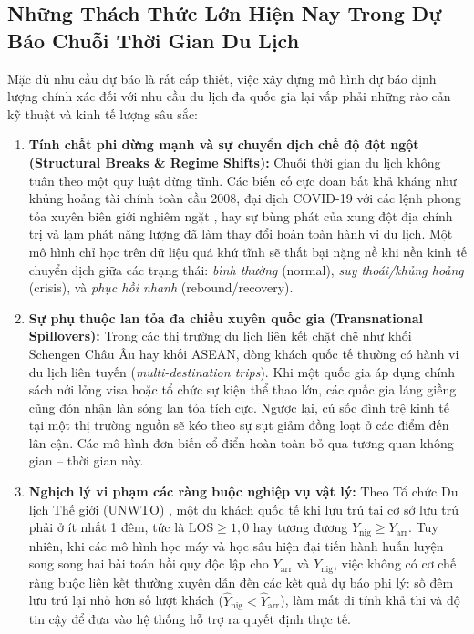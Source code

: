 \subsection{Những Thách Thức Lớn Hiện Nay Trong Dự Báo Chuỗi Thời Gian Du Lịch}
Mặc dù nhu cầu dự báo là rất cấp thiết, việc xây dựng mô hình dự báo định lượng chính xác đối với nhu cầu du lịch đa quốc gia lại vấp phải những rào cản kỹ thuật và kinh tế lượng sâu sắc:
\begin{enumerate}
    \item \textbf{Tính chất phi dừng mạnh và sự chuyển dịch chế độ đột ngột (Structural Breaks \& Regime Shifts):} Chuỗi thời gian du lịch không tuân theo một quy luật dừng tĩnh. Các biến cố cực đoan bất khả kháng như khủng hoảng tài chính toàn cầu 2008, đại dịch COVID-19 với các lệnh phong tỏa xuyên biên giới nghiêm ngặt \cite{gossling2020pandemics, hale2021oxford}, hay sự bùng phát của xung đột địa chính trị và lạm phát năng lượng đã làm thay đổi hoàn toàn hành vi du lịch. Một mô hình chỉ học trên dữ liệu quá khứ tĩnh sẽ thất bại nặng nề khi nền kinh tế chuyển dịch giữa các trạng thái: \textit{bình thường} (normal), \textit{suy thoái/khủng hoảng} (crisis), và \textit{phục hồi nhanh} (rebound/recovery).
    \item \textbf{Sự phụ thuộc lan tỏa đa chiều xuyên quốc gia (Transnational Spillovers):} Trong các thị trường du lịch liên kết chặt chẽ như khối Schengen Châu Âu hay khối ASEAN, dòng khách quốc tế thường có hành vi du lịch liên tuyến (\textit{multi-destination trips}). Khi một quốc gia áp dụng chính sách nới lỏng visa hoặc tổ chức sự kiện thể thao lớn, các quốc gia láng giềng cũng đón nhận làn sóng lan tỏa tích cực. Ngược lại, cú sốc đình trệ kinh tế tại một thị trường nguồn sẽ kéo theo sự sụt giảm đồng loạt ở các điểm đến lân cận. Các mô hình đơn biến cổ điển hoàn toàn bỏ qua tương quan không gian -- thời gian này.
    \item \textbf{Nghịch lý vi phạm các ràng buộc nghiệp vụ vật lý:} Theo Tổ chức Du lịch Thế giới (UNWTO) \cite{unwto2010recommendations}, một du khách quốc tế khi lưu trú tại cơ sở lưu trú phải ở ít nhất 1 đêm, tức là $\text{LOS} \ge 1{,}0$ hay tương đương $Y_{\text{nig}} \ge Y_{\text{arr}}$. Tuy nhiên, khi các mô hình học máy và học sâu hiện đại tiến hành huấn luyện song song hai bài toán hồi quy độc lập cho $Y_{\text{arr}}$ và $Y_{\text{nig}}$, việc không có cơ chế ràng buộc liên kết thường xuyên dẫn đến các kết quả dự báo phi lý: số đêm lưu trú lại nhỏ hơn số lượt khách ($\hat{Y}_{\text{nig}} < \hat{Y}_{\text{arr}}$), làm mất đi tính khả thi và độ tin cậy để đưa vào hệ thống hỗ trợ ra quyết định thực tế.

\end{enumerate}
